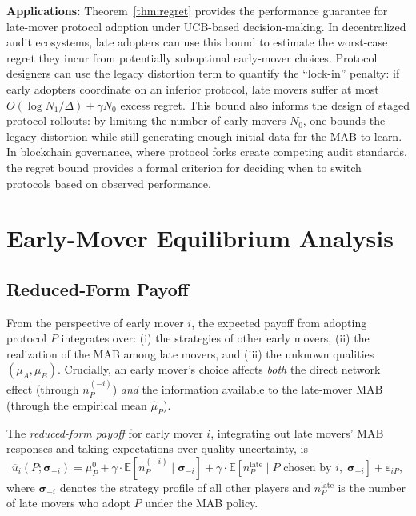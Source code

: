 \documentclass[12pt,a4paper]{article}
\newcommand{\E}{\mathbb{E}}
\begin{document}
\medskip\noindent
\textbf{Applications:}
Theorem~\ref{thm:regret} provides the performance guarantee for late-mover
protocol adoption under UCB-based decision-making.  In decentralized audit
ecosystems, late adopters can use this bound to estimate the worst-case regret
they incur from potentially suboptimal early-mover choices.  Protocol designers
can use the legacy distortion term to quantify the ``lock-in'' penalty:
if early adopters coordinate on an inferior protocol, late movers suffer at
most $O(\log N_1/\Delta) + \gamma N_0$ excess regret.  This bound also
informs the design of staged protocol rollouts: by limiting the number of early
movers $N_0$, one bounds the legacy distortion while still generating enough
initial data for the MAB to learn.  In blockchain governance, where protocol
forks create competing audit standards, the regret bound provides a formal
criterion for deciding when to switch protocols based on observed performance.

\section{Early-Mover Equilibrium Analysis}

\subsection{Reduced-Form Payoff}

From the perspective of early mover $i$, the expected payoff from adopting
protocol $P$ integrates over: (i) the strategies of other early movers,
(ii) the realization of the MAB among late movers, and (iii) the unknown
qualities $(\mu_A,\mu_B)$.  Crucially, an early mover's choice affects
\emph{both} the direct network effect (through $n_P^{(-i)}$) \emph{and} the
information available to the late-mover MAB (through the empirical mean
$\hat{\mu}_P$).

\medskip\noindent
The \emph{reduced-form payoff} for early mover $i$, integrating out late
movers' MAB responses and taking expectations over quality uncertainty, is
\begin{equation}\label{eq:reduced-payoff}
    \overline{u}_i(P; \boldsymbol{\sigma}_{-i}) =
    \mu_P^0
    + \gamma\cdot\E[n_P^{(-i)}\mid\boldsymbol{\sigma}_{-i}]
    + \gamma\cdot\E[n_P^{\text{late}}\mid P\text{ chosen by }i,\;
                     \boldsymbol{\sigma}_{-i}]
    + \varepsilon_{iP},
\end{equation}
where $\boldsymbol{\sigma}_{-i}$ denotes the strategy profile of all other
players and $n_P^{\text{late}}$ is the number of late movers who adopt $P$
under the MAB policy.
\end{document}
